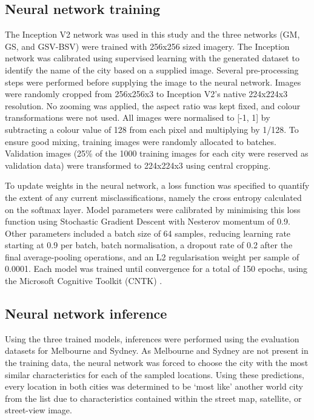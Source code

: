 \documentclass[Crown,sageh,times]{sagej}
\begin{document}
\subsection{Neural network training}\label{sec:methods4}    

The Inception V2 network was used in this study and the three networks (GM, GS, and GSV-BSV) were trained with 256x256 sized imagery. The Inception network was calibrated using supervised learning with the generated dataset to identify the name of the city based on a supplied image. Several pre-processing steps were performed before supplying the image to the neural network. Images were randomly cropped from 256x256x3 to Inception V2's native 224x224x3 resolution. No zooming was applied, the aspect ratio was kept fixed, and colour transformations were not used. All images were normalised to [-1, 1] by subtracting a colour value of 128 from each pixel and multiplying by 1/128. To ensure good mixing, training images were randomly allocated to batches. Validation images (25\% of the 1000 training images for each city were reserved as validation data) were transformed to 224x224x3 using central cropping.


To update weights in the neural network, a loss function was specified to quantify the extent of any current misclassifications, namely the cross entropy calculated on the softmax layer. Model parameters were calibrated by minimising this loss function using Stochastic Gradient Descent with Nesterov momentum of 0.9. Other parameters included a batch size of 64 samples, reducing learning rate starting at 0.9 per batch, batch normalisation, a dropout rate of 0.2 after the final average-pooling operations, and an L2 regularisation weight per sample of 0.0001. Each model was trained until convergence for a total of 150 epochs, using the Microsoft Cognitive Toolkit (CNTK) \cite{Yu2015}. 


\subsection{Neural network inference}\label{sec:methods5}    
Using the three trained models, inferences were performed using the evaluation datasets for Melbourne and Sydney. As Melbourne and Sydney are not present in the training data, the neural network was forced to choose the city with the most similar characteristics for each of the sampled locations. Using these predictions, every location in both cities was determined to be `most like' another world city from the list due to  characteristics contained within the street map, satellite, or street-view image.
\end{document}
